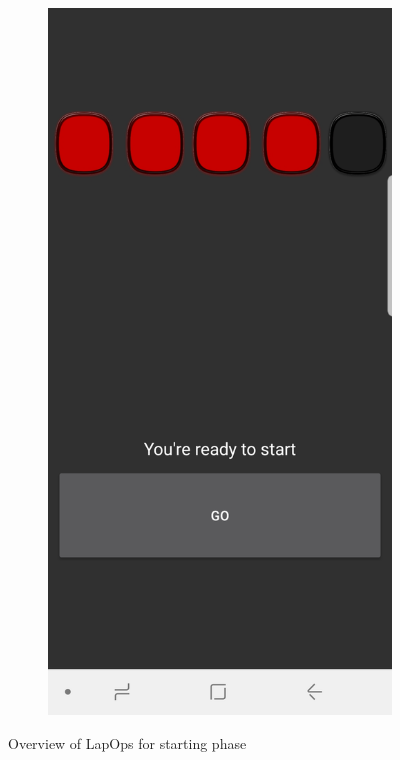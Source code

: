 \begin{figure}[H]
\begin{subfigure}[c]{0.4\textwidth}
	\end{subfigure}
	\hfill
	\begin{subfigure}[c]{0.4\textwidth}
		\includegraphics[width=\textwidth]{Pictures/App/FieldActivated.jpg}
		
	\end{subfigure}
	\caption{Overview of LapOps for starting phase}
	\label{LabOpsnearfield}
\end{figure}

